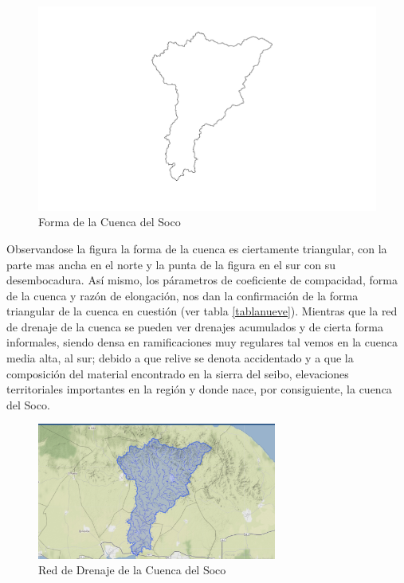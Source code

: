 \documentclass[11pt,]{article}
\begin{document}
\begin{figure}
\centering
\includegraphics{form cu soc.png}
\caption{Forma de la Cuenca del Soco\label{mapacero}}
\end{figure}

Observandose la figura la forma de la cuenca es ciertamente triangular,
con la parte mas ancha en el norte y la punta de la figura en el sur con
su desembocadura. Así mismo, los párametros de coeficiente de
compacidad, forma de la cuenca y razón de elongación, nos dan la
confirmación de la forma triangular de la cuenca en cuestión (ver tabla
\ref{tablanueve}). Mientras que la red de drenaje de la cuenca se pueden
ver drenajes acumulados y de cierta forma informales, siendo densa en
ramificaciones muy regulares tal vemos en la cuenca media alta, al sur;
debido a que relive se denota accidentado y a que la composición del
material encontrado en la sierra del seibo, elevaciones territoriales
importantes en la región y donde nace, por consiguiente, la cuenca del
Soco.

\begin{figure}
\centering
\includegraphics[width=0.70000\textwidth]{denaje.png}
\caption{Red de Drenaje de la Cuenca del Soco\label{mapanueve}}
\end{figure}
\end{document}
